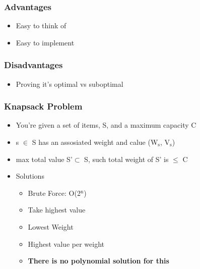 \documentclass[11pt]{article}
\begin{document}
\subsubsection*{Advantages}
\label{sec:org9bacdb2}
\begin{itemize}
\item Easy to think of
\item Easy to implement
\end{itemize}
\subsubsection*{Disadvantages}
\label{sec:org03bb863}
\begin{itemize}
\item Proving it's optimal vs suboptimal
\end{itemize}
\subsubsection*{Knapsack Problem}
\label{sec:org201d22e}
\begin{itemize}
\item You're given a set of items, S, and a maximum capacity C
\item s \(\in\) S has an assosiated weight and calue (W\(_{\text{s}}\), V\(_{\text{s}}\))
\item max total value S'\(\subset\) S, such total weight of S' is \(\le\) C
\end{itemize}
\begin{itemize}
\item Solutions
\label{sec:org5dbef75}
\begin{itemize}
\item Brute Force: O(2\(^{\text{n}}\))
\item Take highest value
\item Lowest Weight
\item Highest value per weight
\item \textbf{There is no polynomial solution for this}
\end{itemize}
\end{itemize}
\end{document}
